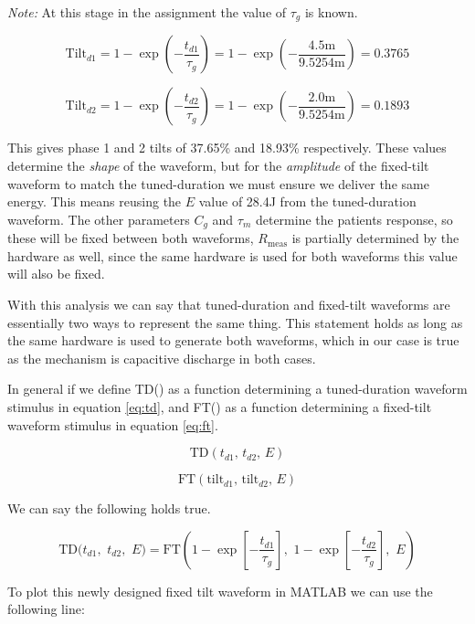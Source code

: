 \documentclass[]{report}
\begin{document}
\textit{Note:} At this stage in the assignment the value of $\tau_g$ is known.

\[
	\text{Tilt}_{d1} = 1 - \exp{\left( - \frac{t_{d1}}{\tau_g} \right)} = 1 - \exp{\left( - \frac{4.5 \text{m}}{9.5254 \text{m}} \right)} = 0.3765
\]

\[
	\text{Tilt}_{d2} = 1 - \exp{\left( - \frac{t_{d2}}{\tau_g} \right)} = 1 - \exp{\left( - \frac{2.0 \text{m}}{9.5254 \text{m}} \right)} = 0.1893
\]

This gives phase 1 and 2 tilts of 37.65\% and 18.93\% respectively. These values determine the \textit{shape} of the waveform, but for the \textit{amplitude} of the fixed-tilt waveform to match the tuned-duration we must ensure we deliver the same energy. This means reusing the $E$ value of 28.4J from the tuned-duration waveform. The other parameters $C_g$ and $\tau_m$  determine the patients response, so these will be fixed between both waveforms, $R_\text{meas}$ is partially determined by the hardware as well, since the same hardware is used for both waveforms this value will also be fixed.

With this analysis we can say that tuned-duration and fixed-tilt waveforms are essentially two ways to represent the same thing. This statement holds as long as the same hardware is used to generate both waveforms, which in our case is true as the mechanism is capacitive discharge in both cases.

In general if we define TD() as a function determining a tuned-duration waveform stimulus in equation \ref{eq:td}, and FT() as a function determining a fixed-tilt waveform stimulus in equation \ref{eq:ft}. 

\begin{equation}
\label{eq:td}
\text{TD}\left( t_{d1}, \, t_{d2}, \, E \right)
\end{equation}

\begin{equation}
\label{eq:ft}
\text{FT}\left( \text{tilt}_{d1}, \, \text{tilt}_{d2}, \, E \right)
\end{equation}

We can say the following holds true.

\[
\text{TD}\bigg( t_{d1}, \,\, t_{d2}, \,\, E \bigg) = \text{FT}\left( 1 - \exp{\left[ - \frac{t_{d1}}{\tau_g} \right]}, \,\, 1 - \exp{\left[ - \frac{t_{d2}}{\tau_g} \right]}, \,\, E \right)
\]

To plot this newly designed fixed tilt waveform in MATLAB we can use the following line:
\end{document}
